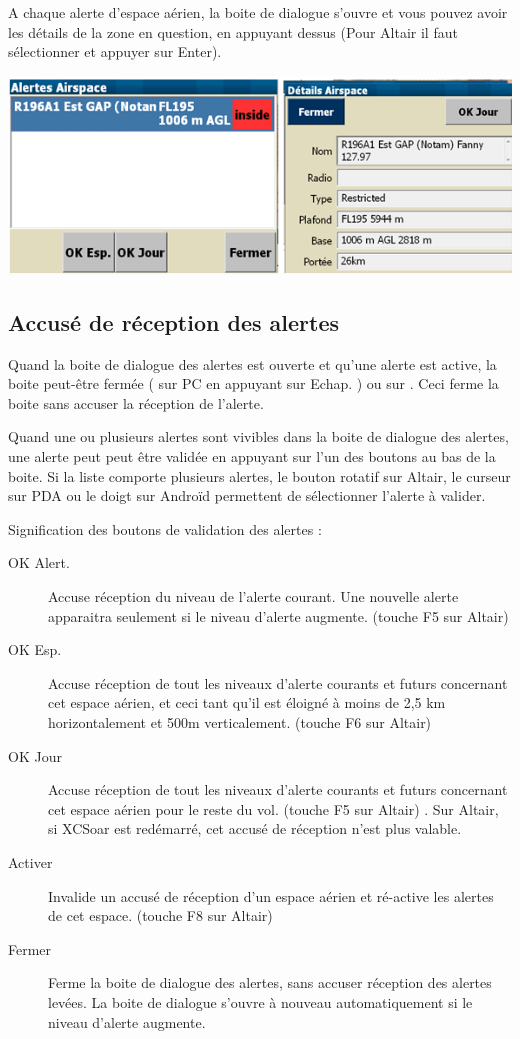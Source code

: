 A chaque alerte d'espace aérien, la boite de dialogue s'ouvre et vous pouvez avoir les détails de la zone en question, en appuyant dessus (Pour Altair il faut sélectionner et appuyer sur Enter).
\begin{center}
\includegraphics[angle=0,width=\linewidth,keepaspectratio='true']{figures/alerteespaceaerien2.png}
\end{center}


\subsection*{Accusé de réception des alertes}

Quand la boite de dialogue des alertes est ouverte et qu'une alerte est active, la boite peut-être fermée ( sur PC en appuyant sur Echap. ) ou sur  . Ceci ferme la boite sans accuser la réception de l'alerte.

Quand une ou plusieurs alertes sont vivibles dans la boite de dialogue des alertes, une alerte peut peut être validée en appuyant sur l'un des boutons au bas de la boite. Si la liste comporte plusieurs alertes, le bouton rotatif sur Altair, le curseur sur PDA ou le doigt sur Androïd permettent de sélectionner l'alerte à valider.

Signification des boutons de validation  des alertes :
\begin{description}
\item[OK Alert.]  Accuse réception du niveau de l'alerte courant. Une nouvelle alerte apparaitra seulement si le niveau d'alerte augmente. (touche F5 sur Altair)
\item[OK Esp.]  Accuse réception de tout les niveaux d'alerte courants et futurs concernant cet espace aérien, et ceci tant qu'il est éloigné à moins de 2,5 km horizontalement et 500m verticalement. (touche F6 sur Altair)
\item[OK Jour]  Accuse réception de tout les niveaux d'alerte courants et futurs concernant cet espace aérien pour le reste du vol. (touche F5 sur Altair) . Sur Altair, si XCSoar est redémarré, cet accusé de réception n'est plus valable.
\item[Activer]  Invalide un accusé de réception d'un espace aérien et ré-active les alertes de cet espace. (touche F8 sur Altair)
\item[Fermer] Ferme la boite de dialogue des alertes, sans accuser réception des alertes levées. La boite de dialogue s'ouvre à nouveau automatiquement si le niveau d'alerte augmente.
\end{description}

